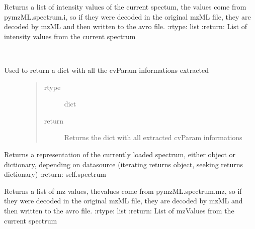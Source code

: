 \documentclass[letterpaper,10pt,english]{sphinxmanual}
\begin{document}
\begin{fulllineitems}
\begin{fulllineitems}
\label{avroSpectrum:avroSpectrum.avroSpectrum.getIntensityArray}
Returns a list of intensity values of the current spectum, the values come from pymzML.spectrum.i,
so if they were decoded in the original
mzML file, they are decoded by mzML and then written to the avro file.
:rtype: list
:return: List of intensity values from the current spectrum

\end{fulllineitems}


\begin{fulllineitems}
\label{avroSpectrum:avroSpectrum.avroSpectrum.getMSDict}~\begin{description}
\item[{Used to return a dict with all the cvParam informations extracted}] \leavevmode\begin{quote}\begin{description}
\item[{rtype}] \leavevmode
dict

\item[{return}] \leavevmode
Returns the  dict with all extracted cvParam informations

\end{description}\end{quote}

\end{description}

\end{fulllineitems}


\begin{fulllineitems}
\label{avroSpectrum:avroSpectrum.avroSpectrum.getSpectrum}
Returns a representation of the currently loaded spectrum, either object or dictionary, depending on datasource
(iterating returns object, seeking returns dictionary)
:return: self.spectrum

\end{fulllineitems}


\begin{fulllineitems}
\label{avroSpectrum:avroSpectrum.avroSpectrum.getmzArray}
Returns a list of mz values, thevalues come from pymzML.spectrum.mz, so if they were decoded in the original
mzML file, they are decoded by mzML and then written to the avro file.
:rtype: list
:return: List of mzValues from the current spectrum


\end{fulllineitems}
\end{fulllineitems}
\end{document}
